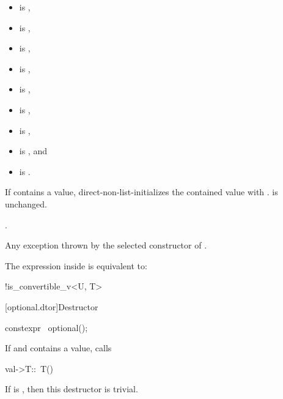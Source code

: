 \begin{itemdescr}
\pnum
\constraints
\begin{itemize}
\item {} is ,
\item {} is ,
\item {} is ,
\item {} is ,
\item {} is ,
\item {} is ,
\item {} is ,
\item {} is , and
\item {} is .
\end{itemize}

\pnum
\effects
If  contains a value,
direct-non-list-initializes the contained value with .
 is unchanged.

\pnum
\ensures
{}.

\pnum
\throws
Any exception thrown by the selected constructor of .

\pnum
\remarks
The expression inside  is equivalent to:
\begin{codeblock}
!is_convertible_v<U, T>
\end{codeblock}
\end{itemdescr}

[optional.dtor]{Destructor}

%
\begin{itemdecl}
constexpr ~optional();
\end{itemdecl}

\begin{itemdescr}
\pnum
\effects
If  and  contains a value, calls
\begin{codeblock}
val->T::~T()
\end{codeblock}

\pnum
\remarks
If  is , then this destructor is trivial.
\end{itemdescr}

